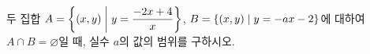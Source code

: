 두 집합 $A=\biggl\{(x{,}\mkern3mu\mathopen{}y) \biggm| y=\dfrac{-2x+4}{x}\biggr\}$, $B=\{(x{,}\mkern3mu\mathopen{}y) \mid y=-ax-2\}$에 대하여 $A\cap B=\varnothing$일 때, 실수 $a$의 값의 범위를 구하시오.
